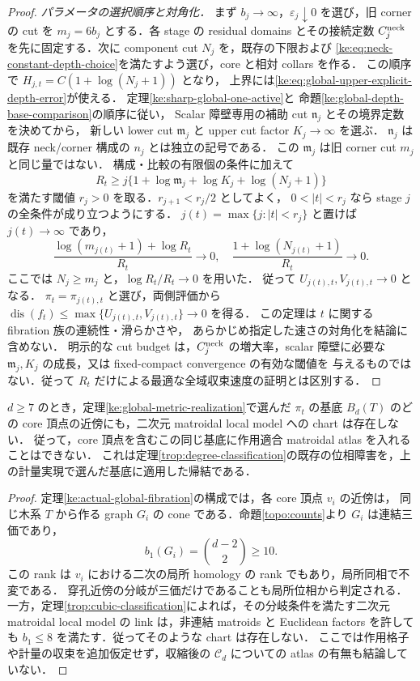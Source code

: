 \begin{proof}
\emph{パラメータの選択順序と対角化．}
まず $b_j\to\infty$，$\varepsilon_j\downarrow0$ を選び，旧 corner の cut を
$m_j=6b_j$ とする．各 stage の residual domains とその接続定数
$C_j^{\rm neck}$ を先に固定する．次に component cut $N_j$ を，既存の下限および
\eqref{ke:eq:neck-constant-depth-choice}を満たすよう選び，core と相対 collars を作る．
この順序で $H_{j,t}=C(1+\log(N_j+1))$ となり，
上界には\eqref{ke:eq:global-upper-explicit-depth-error}が使える．
定理\ref{ke:sharp-global-one-active}と
命題\ref{ke:global-depth-base-comparison}の順序に従い，
Scalar 障壁専用の補助 cut $\mathfrak n_j$ とその境界定数を決めてから，
新しい lower cut $\mathfrak m_j$ と upper cut factor $K_j\to\infty$ を選ぶ．
$\mathfrak n_j$ は既存 neck/corner 構成の $n_j$ とは独立の記号である．
この $\mathfrak m_j$ は旧 corner cut $m_j$ と同じ量ではない．
構成・比較の有限個の条件に加えて
\begin{equation}\label{ke:eq:global-realization-diagonal}
 R_t\ge j\{1+\log\mathfrak m_j+\log K_j+\log(N_j+1)\}
\end{equation}
を満たす閾値 $r_j>0$ を取る．$r_{j+1}<r_j/2$ としてよく，
$0<|t|<r_j$ なら stage $j$ の全条件が成り立つようにする．
$j(t)=\max\{j:|t|<r_j\}$ と置けば $j(t)\to\infty$ であり，
\[
 \frac{\log(m_{j(t)}+1)+\log R_t}{R_t}\to0,
 \quad \frac{1+\log(N_{j(t)}+1)}{R_t}\to0.
\]
ここでは $N_j\ge m_j$ と，$\log R_t/R_t\to0$ を用いた．
従って $U_{j(t),t},V_{j(t),t}\to0$ となる．
$\pi_t=\pi_{j(t),t}$ と選び，両側評価から
$\operatorname{dis}(f_t)\le\max\{U_{j(t),t},V_{j(t),t}\}\to0$ を得る．
この定理は $t$ に関する fibration 族の連続性・滑らかさや，
あらかじめ指定した速さの対角化を結論に含めない．
明示的な cut budget は，$C_j^{\rm neck}$ の増大率，scalar 障壁に必要な
$\mathfrak m_j,K_j$ の成長，又は fixed-compact convergence の有効な閾値を
与えるものではない．従って $R_t$ だけによる最適な全域収束速度の証明とは区別する．
\end{proof}

\begin{corollary}
\label{ke:global-core-nonmatroidal}
$d\ge7$ のとき，定理\ref{ke:global-metric-realization}で選んだ $\pi_t$ の基底
$B_d(T)$ のどの core 頂点の近傍にも，二次元 matroidal local model への chart は存在しない．
従って，core 頂点を含むこの同じ基底に作用適合 matroidal atlas を入れることはできない．
これは定理\ref{trop:degree-classification}の既存の位相障害を，上の計量実現で選んだ基底に適用した帰結である．
\end{corollary}
\begin{proof}
定理\ref{ke:actual-global-fibration}の構成では，各 core 頂点 $v_i$ の近傍は，
同じ木系 $T$ から作る graph $G_i$ の cone である．命題\ref{topo:counts}より
$G_i$ は連結三価であり，
\[
 b_1(G_i)=\binom{d-2}{2}\ge10.
\]
この rank は $v_i$ における二次の局所 homology の rank でもあり，局所同相で不変である．
穿孔近傍の分岐が三価だけであることも局所位相から判定される．
一方，定理\ref{trop:cubic-classification}によれば，その分岐条件を満たす二次元
matroidal local model の link は，非連結 matroids と Euclidean factors を許しても
$b_1\le8$ を満たす．従ってそのような chart は存在しない．
ここでは作用格子や計量の収束を追加仮定せず，収縮後の $\mathcal C_d$ についての
atlas の有無も結論していない．
\end{proof}

